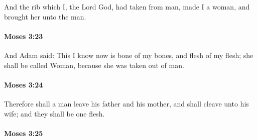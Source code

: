 			And the rib which I, the Lord God, had taken from man, made I a woman, and brought her unto the man.


		\paragraph{Moses 3:23} %
			\label{MOSES-3-23}

			And Adam said: This I know now is bone of my bones, and flesh of my flesh; she shall be called Woman, because she was taken out of man.


		\paragraph{Moses 3:24} %
			\label{MOSES-3-24}

			Therefore shall a man leave his father and his mother, and shall cleave unto his wife; and they shall be one flesh.


		\paragraph{Moses 3:25} %
			\label{MOSES-3-25}

